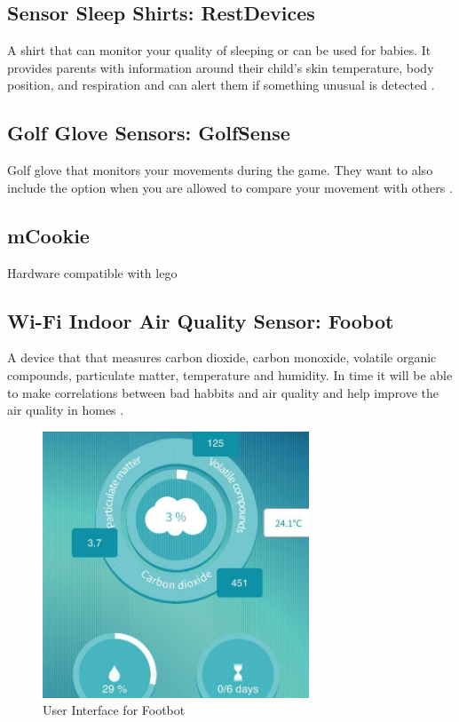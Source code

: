 \documentclass[12pt]{article}
\begin{document}
\subsection {Sensor Sleep Shirts: RestDevices} A shirt that can monitor your quality of sleeping or can be used for babies. It provides parents with information around their child's skin temperature, body position, and respiration and can alert them if something unusual is detected \cite{shirt}.
\subsection {Golf Glove Sensors: GolfSense}  Golf glove that monitors your movements during the game. They want to also include the option when you are allowed to compare your movement with others \cite{golf}. 

\subsection {mCookie} Hardware compatible with lego \cite{lego}
\subsection {Wi-Fi Indoor Air Quality Sensor: Foobot}

A device that that measures carbon dioxide, carbon monoxide, volatile organic compounds, particulate matter, temperature and humidity. In time it will be able to make correlations between bad habbits and air quality and help improve the air quality in homes \cite{air}.
\begin{figure}
\caption{User Interface for Footbot}
\includegraphics{ai}

\end{figure}
\end{document}
